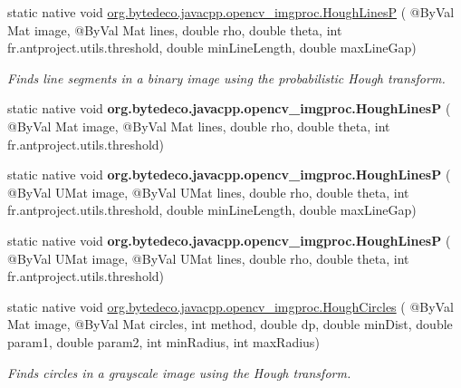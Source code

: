\begin{DoxyCompactItemize}
\item 
static native void \hyperlink{group__imgproc__feature_gaac39ae22179f4396e7034f6d2a4cce1e}{org.\+bytedeco.\+javacpp.\+opencv\+\_\+imgproc.\+Hough\+LinesP} ( @By\+Val Mat image, @By\+Val Mat lines, double rho, double theta, int fr.antproject.utils.threshold, double min\+Line\+Length, double max\+Line\+Gap)
\begin{DoxyCompactList}\small\item\em Finds line segments in a binary image using the probabilistic Hough transform. \end{DoxyCompactList}\item 
\mbox{\label{group__imgproc__feature_ga8ae382715260ab4425f1ce1a63b121d0}} 
static native void {\bfseries org.\+bytedeco.\+javacpp.\+opencv\+\_\+imgproc.\+Hough\+LinesP} ( @By\+Val Mat image, @By\+Val Mat lines, double rho, double theta, int fr.antproject.utils.threshold)
\item 
\mbox{\label{group__imgproc__feature_ga57014edb8289247a7afc3a944a144656}} 
static native void {\bfseries org.\+bytedeco.\+javacpp.\+opencv\+\_\+imgproc.\+Hough\+LinesP} ( @By\+Val U\+Mat image, @By\+Val U\+Mat lines, double rho, double theta, int fr.antproject.utils.threshold, double min\+Line\+Length, double max\+Line\+Gap)
\item 
\mbox{\label{group__imgproc__feature_gada7af245d4c89baddda852e114d53588}} 
static native void {\bfseries org.\+bytedeco.\+javacpp.\+opencv\+\_\+imgproc.\+Hough\+LinesP} ( @By\+Val U\+Mat image, @By\+Val U\+Mat lines, double rho, double theta, int fr.antproject.utils.threshold)
\item 
static native void \hyperlink{group__imgproc__feature_ga600228eea1d6673137492fb0d0c1b8d5}{org.\+bytedeco.\+javacpp.\+opencv\+\_\+imgproc.\+Hough\+Circles} ( @By\+Val Mat image, @By\+Val Mat circles, int method, double dp, double min\+Dist, double param1, double param2, int min\+Radius, int max\+Radius)
\begin{DoxyCompactList}\small\item\em Finds circles in a grayscale image using the Hough transform. \end{DoxyCompactList}\item 
\mbox{\label{group__imgproc__feature_gad95610778f296561275a932b70bcbf4d}} 

\end{DoxyCompactItemize}
